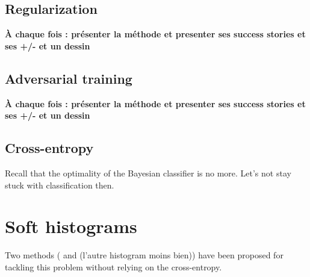 \subsection{Regularization} %
\label{sub:regularization}



\textbf{À chaque fois : présenter la méthode et presenter ses success stories et ses +/- et un dessin}





\subsection{Adversarial training} %
\label{sub:adversarial_training}



\textbf{À chaque fois : présenter la méthode et presenter ses success stories et ses +/- et un dessin}




\subsection{Cross-entropy} %
\label{sub:cross_entropy}

Recall that the optimality of the Bayesian classifier is no more.
Let's not stay stuck with classification then.









\section{Soft histograms} %
\label{sec:soft_histograms}



Two methods (\cite{DECASTRO2019170inferno} and \needcite(l'autre histogram moins bien)) have been proposed for tackling this problem without relying on the cross-entropy.


